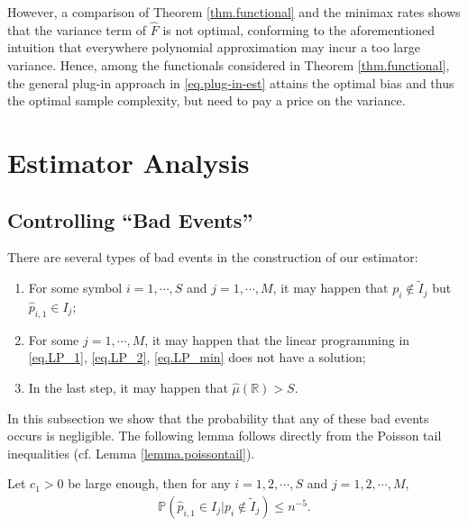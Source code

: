 \documentclass[final,12pt]{colt2018} %
\newcommand{\reals}{\mathbb{R}}
\begin{document}
However, a comparison of Theorem \ref{thm.functional} and the minimax rates shows that the variance term of $\hat{F}$ is not optimal, conforming to the aforementioned intuition that everywhere polynomial approximation may incur a too large variance. Hence, among the functionals considered in Theorem \ref{thm.functional}, the general plug-in approach in \eqref{eq.plug-in-est} attains the optimal bias and thus the optimal sample complexity, but need to pay a price on the variance.

\clearpage


\clearpage
\appendix

\section{Estimator Analysis}\label{sec.analysis}
\subsection{Controlling ``Bad Events''}
There are several types of bad events in the construction of our estimator: 
\begin{enumerate}
	\item For some symbol $i=1,\cdots,S$ and $j=1,\cdots,M$, it may happen that $p_i\notin \tilde{I}_j$ but $\hat{p}_{i,1}\in I_j$;
	\item For some $j=1,\cdots,M$, it may happen that the linear programming in \eqref{eq.LP_1}, \eqref{eq.LP_2}, \eqref{eq.LP_min} does not have a solution;
	\item In the last step, it may happen that $\hat{\mu}(\reals)>S$.
\end{enumerate}
In this subsection we show that the probability that any of these bad events occurs is negligible. The following lemma follows directly from the Poisson tail inequalities (cf. Lemma \ref{lemma.poissontail}).
\begin{lemma}\label{lemma.concentration}
	Let $c_1>0$ be large enough, then for any $i=1,2,\cdots,S$ and $j=1,2,\cdots,M$,
	\begin{align*}
	\mathbb{P}(\hat{p}_{i,1}\in I_j|p_i\notin \tilde{I}_j) \le n^{-5}.
	\end{align*}
\end{lemma} 
\end{document}
